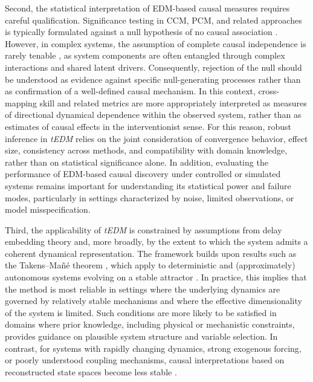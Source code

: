 \documentclass[authoryear,preprint,review,12pt]{elsarticle}
\begin{document}
Second, the statistical interpretation of EDM-based causal measures requires careful qualification. Significance testing in CCM, PCM, and related approaches is typically formulated against a null hypothesis of no causal association \citep{tao2023cmc}. However, in complex systems, the assumption of complete causal independence is rarely tenable \citep{meehl1990all_cor_vars}, as system components are often entangled through complex interactions and shared latent drivers. Consequently, rejection of the null should be understood as evidence against specific null-generating processes rather than as confirmation of a well-defined causal mechanism. In this context, cross-mapping skill and related metrics are more appropriately interpreted as measures of directional dynamical dependence within the observed system, rather than as estimates of causal effects in the interventionist sense. For this reason, robust inference in \textit{tEDM} relies on the joint consideration of convergence behavior, effect size, consistency across methods, and compatibility with domain knowledge, rather than on statistical significance alone. In addition, evaluating the performance of EDM-based causal discovery under controlled or simulated systems remains important for understanding its statistical power and failure modes, particularly in settings characterized by noise, limited observations, or model misspecification.

Third, the applicability of \textit{tEDM} is constrained by assumptions from delay embedding theory and, more broadly, by the extent to which the system admits a coherent dynamical representation. The framework builds upon results such as the Takens--Ma{\~n}{\'e} theorem \citep{Takens1981embedding,Mane1981embedding}, which apply to deterministic and (approximately) autonomous systems evolving on a stable attractor \citep{leng2020pcm}. In practice, this implies that the method is most reliable in settings where the underlying dynamics are governed by relatively stable mechanisms and where the effective dimensionality of the system is limited. Such conditions are more likely to be satisfied in domains where prior knowledge, including physical or mechanistic constraints, provides guidance on plausible system structure and variable selection. In contrast, for systems with rapidly changing dynamics, strong exogenous forcing, or poorly understood coupling mechanisms, causal interpretations based on reconstructed state spaces become less stable \citep{butler2023discussion_of_ccm,park2023gobi}.
\end{document}
